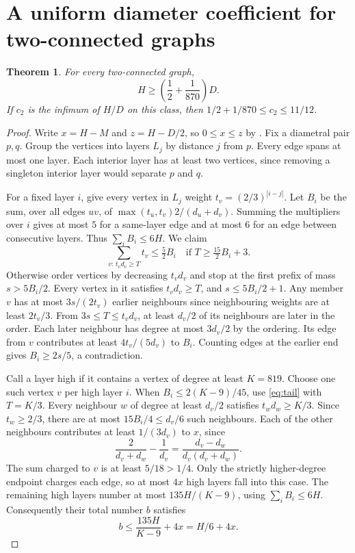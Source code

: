 \documentclass[11pt,a4paper]{article}
\newtheorem{theorem}{Theorem}[section]
\begin{document}
\section{A uniform diameter coefficient for two-connected graphs}
\begin{theorem}\label{thm:slope}
For every two-connected graph,
\[
 H\ge\left(\frac12+\frac1{870}\right)D .
\]
If $c_2$ is the infimum of $H/D$ on this class, then $1/2+1/870\le c_2\le11/12$.
\end{theorem}
\begin{proof}
Write $x=H-M$ and $z=H-D/2$, so $0\le x\le z$ by \cite[Thm.~3]{dls}. Fix a diametral pair $p,q$. Group the vertices into layers $L_j$ by distance $j$ from $p$. Every edge spans at most one layer. Each interior layer has at least two vertices, since removing a singleton interior layer would separate $p$ and $q$.

For a fixed layer $i$, give every vertex in $L_j$ weight $t_v=(2/3)^{|i-j|}$. Let $B_i$ be the sum, over all edges $uv$, of $\max(t_u,t_v)2/(d_u+d_v)$. Summing the multipliers over $i$ gives at most $5$ for a same-layer edge and at most $6$ for an edge between consecutive layers. Thus $\sum_i B_i\le6H$. We claim
\begin{equation}\label{eq:tail}
 \sum_{v:\,t_vd_v\ge T} t_v\le \tfrac52 B_i
 \quad\text{if } T\ge\tfrac{15}2 B_i+3 .
\end{equation}
Otherwise order vertices by decreasing $t_vd_v$ and stop at the first prefix of mass $s>5B_i/2$. Every vertex in it satisfies $t_vd_v\ge T$, and $s\le5B_i/2+1$. Any member $v$ has at most $3s/(2t_v)$ earlier neighbours since neighbouring weights are at least $2t_v/3$. From $3s\le T\le t_vd_v$, at least $d_v/2$ of its neighbours are later in the order. Each later neighbour has degree at most $3d_v/2$ by the ordering. Its edge from $v$ contributes at least $4t_v/(5d_v)$ to $B_i$. Counting edges at the earlier end gives $B_i\ge2s/5$, a contradiction.

Call a layer high if it contains a vertex of degree at least $K=819$. Choose one such vertex $v$ per high layer $i$. When $B_i\le2(K-9)/45$, use \eqref{eq:tail} with $T=K/3$. Every neighbour $w$ of degree at least $d_v/2$ satisfies $t_wd_w\ge K/3$. Since $t_w\ge2/3$, there are at most $15B_i/4\le d_v/6$ such neighbours. Each of the other neighbours contributes at least $1/(3d_v)$ to $x$, since
\[
 \frac2{d_v+d_w}-\frac1{d_v}=\frac{d_v-d_w}{d_v(d_v+d_w)}.
\]
The sum charged to $v$ is at least $5/18>1/4$. Only the strictly higher-degree endpoint charges each edge, so at most $4x$ high layers fall into this case. The remaining high layers number at most $135H/(K-9)$, using $\sum_iB_i\le6H$. Consequently their total number $b$ satisfies
\begin{equation}\label{eq:bad}
 b\le\frac{135H}{K-9}+4x=H/6+4x.
\end{equation}


\end{proof}
\end{document}
